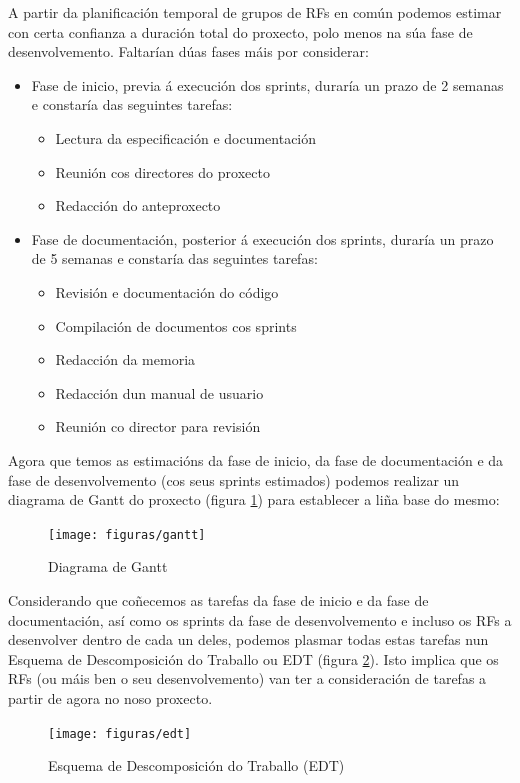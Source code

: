 A partir da planificación temporal de grupos de RFs en común podemos estimar con certa confianza a duración total do proxecto, polo menos na súa fase de desenvolvemento. Faltarían dúas fases máis por considerar:

\begin{itemize}
\item Fase de inicio, previa á execución dos sprints, duraría un prazo de 2 semanas e constaría das seguintes tarefas:
\begin{itemize}
\item Lectura da especificación e documentación
\item Reunión cos directores do proxecto
\item Redacción do anteproxecto
\end{itemize} 
\item Fase de documentación, posterior á execución dos sprints, duraría un prazo de 5 semanas e constaría das seguintes tarefas:
\begin{itemize}
\item Revisión e documentación do código
\item Compilación de documentos cos sprints
\item Redacción da memoria
\item Redacción dun manual de usuario
\item Reunión co director para revisión
\end{itemize}
\end{itemize} 

Agora que temos as estimacións da fase de inicio, da fase de documentación e da fase de desenvolvemento (cos seus sprints estimados) podemos realizar un diagrama de Gantt do proxecto (figura \ref{gantt}) para establecer a liña base do mesmo:

\begin{figure}
\centering
\texttt{[image: figuras/gantt]}
\caption{Diagrama de Gantt}
\label{gantt}
\end{figure}

Considerando que coñecemos as tarefas da fase de inicio e da fase de documentación, así como os sprints da fase de desenvolvemento e incluso os RFs a desenvolver dentro de cada un deles, podemos plasmar todas estas tarefas nun Esquema de Descomposición do Traballo ou EDT (figura \ref{edt}). Isto implica que os RFs (ou máis ben o seu desenvolvemento) van ter a consideración de tarefas a partir de agora no noso proxecto.

\begin{figure}
\centering
\texttt{[image: figuras/edt]}
\caption{Esquema de Descomposición do Traballo (EDT)}
\label{edt}
\end{figure}

